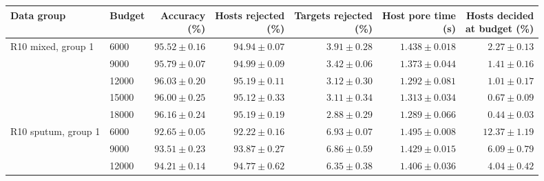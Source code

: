 \begin{tabular}{@{}llrrrrr@{}}
\toprule
Data group & Budget & \shortstack{Accuracy\\(\%)} & \shortstack{Hosts rejected\\(\%)} & \shortstack{Targets rejected\\(\%)} & \shortstack{Host pore time\\(s)} & \shortstack{Hosts decided\\at budget (\%)}\\\midrule
R10 mixed, group 1 & 6000 & $95.52 \pm 0.16$ & $94.94 \pm 0.07$ & $3.91 \pm 0.28$ & $1.438 \pm 0.018$ & $2.27 \pm 0.13$\\
 & 9000 & $95.79 \pm 0.07$ & $94.99 \pm 0.09$ & $3.42 \pm 0.06$ & $1.373 \pm 0.044$ & $1.41 \pm 0.16$\\
 & 12000 & $96.03 \pm 0.20$ & $95.19 \pm 0.11$ & $3.12 \pm 0.30$ & $1.292 \pm 0.081$ & $1.01 \pm 0.17$\\
 & 15000 & $96.00 \pm 0.25$ & $95.12 \pm 0.33$ & $3.11 \pm 0.34$ & $1.313 \pm 0.034$ & $0.67 \pm 0.09$\\
 & 18000 & $96.16 \pm 0.24$ & $95.19 \pm 0.19$ & $2.88 \pm 0.29$ & $1.289 \pm 0.066$ & $0.44 \pm 0.03$\\
\addlinespace
R10 sputum, group 1 & 6000 & $92.65 \pm 0.05$ & $92.22 \pm 0.16$ & $6.93 \pm 0.07$ & $1.495 \pm 0.008$ & $12.37 \pm 1.19$\\
 & 9000 & $93.51 \pm 0.23$ & $93.87 \pm 0.27$ & $6.86 \pm 0.59$ & $1.429 \pm 0.015$ & $6.09 \pm 0.79$\\
 & 12000 & $94.21 \pm 0.14$ & $94.77 \pm 0.62$ & $6.35 \pm 0.38$ & $1.406 \pm 0.036$ & $4.04 \pm 0.42$\\
\bottomrule
\end{tabular}

